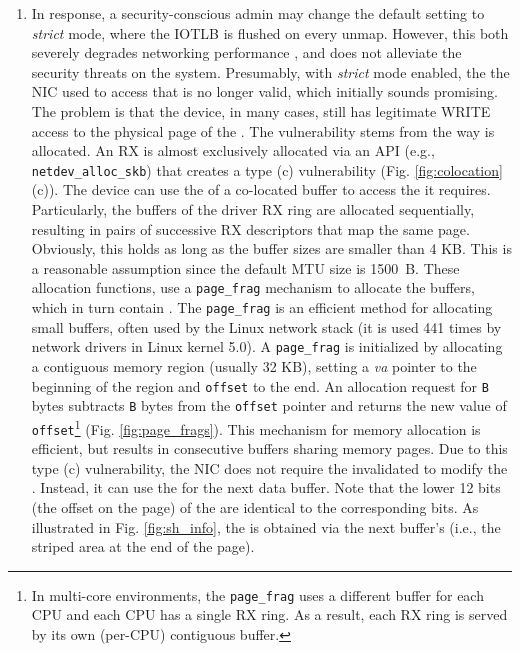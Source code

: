 \begin{enumerate}[label=(\roman*)]
\item In response, a security-conscious admin may change the default setting to \emph{strict} mode, where the IOTLB is flushed on every unmap. However, this both severely degrades networking performance \cite{MMT16,MSMT18}, and does not alleviate the security threats on the system. Presumably, with \emph{strict} mode enabled, the \iova{} the NIC used to access that \shinfo{} is no longer valid, which initially sounds promising. The problem is that the device, in many cases, still has legitimate WRITE access to the physical page of the \shinfo. The vulnerability stems from the way \data{} is allocated. An RX \skb{} is almost exclusively allocated via an API (e.g., \texttt{netdev\_alloc\_skb}) that creates a type (c) \subpage{} vulnerability (Fig. \ref{fig:colocation} (c)). The device can use the \iova{} of a co-located buffer to access the \shinfo{} it requires. Particularly, the buffers of the driver RX ring are allocated sequentially, resulting in pairs of successive RX descriptors that map the same page. Obviously, this holds as long as the buffer sizes are smaller than 4 KB. This is a reasonable assumption since the default MTU size is 1500~B. These allocation functions, use a \texttt{page\_frag} mechanism to allocate the \data{} buffers, which in turn contain \shinfo. The \texttt{page\_frag} is an efficient method for allocating small buffers, often used by the Linux network stack (it is used 441 times by network drivers in Linux kernel 5.0). A \texttt{page\_frag} is initialized by allocating a contiguous memory region (usually 32 KB), setting a \textit{va} pointer to the beginning of the region and \texttt{offset} to the end. An allocation request for \texttt{B} bytes subtracts \texttt{B} bytes from the \texttt{offset} pointer and returns the new value of \texttt{offset}\footnote{In multi-core environments, the \texttt{page\_frag} uses a different buffer for each CPU and each CPU has a single RX ring. As a result, each RX ring is served by its own (per-CPU) contiguous buffer.} (Fig. \ref{fig:page_frags}). This mechanism for memory allocation is efficient, but results in consecutive \data{} buffers sharing memory pages. Due to this type (c) \subpage{} vulnerability, the NIC does not require the invalidated \iova{} to modify the \shinfo. Instead, it can use the \iova{} for the next data buffer. Note that the lower 12 bits (the offset on the page) of the \iova{} are identical to the corresponding \kva{} bits. As illustrated in Fig. \ref{fig:sh_info}, the \oportunity{} is obtained via the next buffer's \iova{} (i.e., the striped area at the end of the page).
\end{enumerate}

